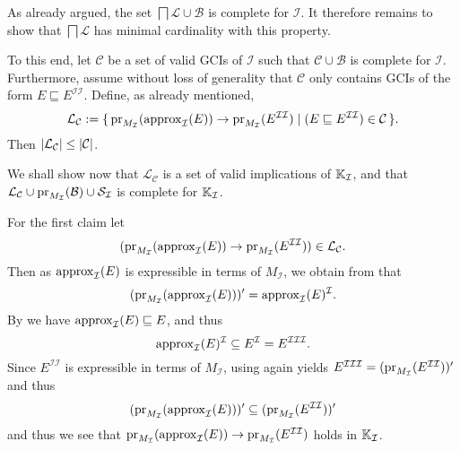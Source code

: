 \begin{Proof}
  As already argued, the set $\bigsqcap \mathcal{L} \cup \mathcal{B}$ is complete for
  $\mathcal{I}$.  It therefore remains to show that $\bigsqcap \mathcal{L}$ has minimal
  cardinality with this property.

  To this end, let $\mathcal{C}$ be a set of valid GCIs of $\mathcal{I}$ such that
  $\mathcal{C} \cup \mathcal{B}$ is complete for $\mathcal{I}$.  Furthermore, assume
  without loss of generality that $\mathcal{C}$ only contains GCIs of the form $E
  \sqsubseteq E^{\mathcal{I}\mathcal{I}}$.  Define, as already mentioned,
  \begin{equation*}
    \mathcal{L}_{\mathcal{C}} := {\{\, \operatorname{pr}_{M_{\mathcal{I}}}(\operatorname{approx}_{\mathcal{I}}(E))
      \to \operatorname{pr}_{M_{\mathcal{I}}}(E^{\mathcal{I}\mathcal{I}}) \mid (E \sqsubseteq
      E^{\mathcal{I}\mathcal{I}}) \in \mathcal{C} \,\}}.
  \end{equation*}
  Then $\lvert \mathcal{L}_{\mathcal{C}} \rvert \le \lvert \mathcal{C} \rvert$.

  We shall show now that $\mathcal{L}_{\mathcal{C}}$ is a set of valid implications of
  ${\mathbb{K}}_{\mathcal{I}}$, and that $\mathcal{L}_{\mathcal{C}} \cup
  \operatorname{pr}_{M_{\mathcal{I}}}(\mathcal{B}) \cup \mathcal{S}_{\mathcal{I}}$ is complete for ${\mathbb{K}}_{\mathcal{I}}$.

  For the first claim let
  \begin{equation*}
    (\operatorname{pr}_{M_{\mathcal{I}}}(\operatorname{approx}_{\mathcal{I}}(E)) \to
    \operatorname{pr}_{M_{\mathcal{I}}}(E^{\mathcal{I}\mathcal{I}})) \in \mathcal{L}_{\mathcal{C}}.
  \end{equation*}
  Then as $\operatorname{approx}_{\mathcal{I}}(E)$ is expressible in terms of $M_{\mathcal{I}}$, we
  obtain from  that
  \begin{equation*}
    (\operatorname{pr}_{M_{\mathcal{I}}}(\operatorname{approx}_{\mathcal{I}}(E)))' = \operatorname{approx}_{\mathcal{I}}(E)^{\mathcal{I}}.
  \end{equation*}
  By  we have $\operatorname{approx}_{\mathcal{I}}(E)
  \sqsubseteq E$, and thus
  \begin{equation*}
    \operatorname{approx}_{\mathcal{I}}(E)^{\mathcal{I}} \subseteq E^{\mathcal{I}} =
    E^{\mathcal{I}\mathcal{I}\mathcal{I}}.
  \end{equation*}
  Since $E^{\mathcal{I}\mathcal{I}}$ is expressible in terms of $M_{\mathcal{I}}$,
  using  again yields
  $E^{\mathcal{I}\mathcal{I}\mathcal{I}} =
  (\operatorname{pr}_{M_{\mathcal{I}}}(E^{\mathcal{I}\mathcal{I}}))'$ and thus
  \begin{equation*}
    (\operatorname{pr}_{M_{\mathcal{I}}}(\operatorname{approx}_{\mathcal{I}}(E)))' \subseteq (\operatorname{pr}_{M_{\mathcal{I}}}(E^{\mathcal{I}\mathcal{I}}))'
  \end{equation*}
  and thus we see that $\operatorname{pr}_{M_{\mathcal{I}}}(\operatorname{approx}_{\mathcal{I}}(E)) \to
  \operatorname{pr}_{M_{\mathcal{I}}}(E^{\mathcal{I}\mathcal{I}})$ holds in ${\mathbb{K}}_{\mathcal{I}}$.


\end{Proof}
